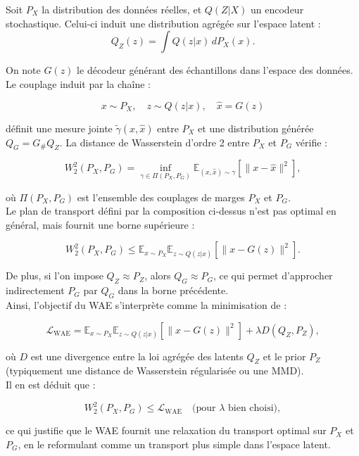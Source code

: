\begin{preuve}
Soit \( P_X \) la distribution des données réelles, et \( Q(Z|X) \) un encodeur stochastique. Celui-ci induit une distribution agrégée sur l’espace latent :
\[
Q_Z(z) = \int Q(z|x) \, dP_X(x).
\]

On note $G(z)$ le décodeur générant des échantillons dans l’espace des données. Le couplage induit par la chaîne :

\[
x \sim P_X, \quad z \sim Q(z|x), \quad \hat{x} = G(z)
\]

définit une mesure jointe $\tilde{\gamma}(x, \hat{x})$ entre $P_X$ et une distribution générée $Q_G = G_\# Q_Z$. La distance de Wasserstein d’ordre 2 entre $P_X$ et $P_G$ vérifie :

\[
W_2^2(P_X, P_G) = \inf_{\gamma \in \Pi(P_X, P_G)} \mathbb{E}_{(x,\hat{x}) \sim \gamma} \left[ \| x - \hat{x} \|^2 \right],
\]

où $\Pi(P_X, P_G)$ est l'ensemble des couplages de marges $P_X$ et $P_G$.\\

Le plan de transport défini par la composition ci-dessus n’est pas optimal en général, mais fournit une borne supérieure :

\[
W_2^2(P_X, P_G) \leq \mathbb{E}_{x \sim P_X} \mathbb{E}_{z \sim Q(z|x)} \left[ \| x - G(z) \|^2 \right].
\]

De plus, si l’on impose $Q_Z \approx P_Z$, alors $Q_G \approx P_G$, ce qui permet d’approcher indirectement $P_G$ par $Q_G$ dans la borne précédente.\\

Ainsi, l’objectif du WAE s’interprète comme la minimisation de :

\[
\mathcal{L}_{\text{WAE}} = \mathbb{E}_{x \sim P_X} \mathbb{E}_{z \sim Q(z|x)} \left[ \| x - G(z) \|^2 \right] + \lambda D(Q_Z, P_Z),
\]

où $D$ est une divergence entre la loi agrégée des latents $Q_Z$ et le prior $P_Z$ (typiquement une distance de Wasserstein régularisée ou une MMD).\\

Il en est déduit que :

\[
W_2^2(P_X, P_G) \leq \mathcal{L}_{\text{WAE}} \quad \text{(pour $\lambda$ bien choisi)},
\]

ce qui justifie que le WAE fournit une relaxation du transport optimal sur $P_X$ et $P_G$, en le reformulant comme un transport plus simple dans l’espace latent.
\end{preuve}

